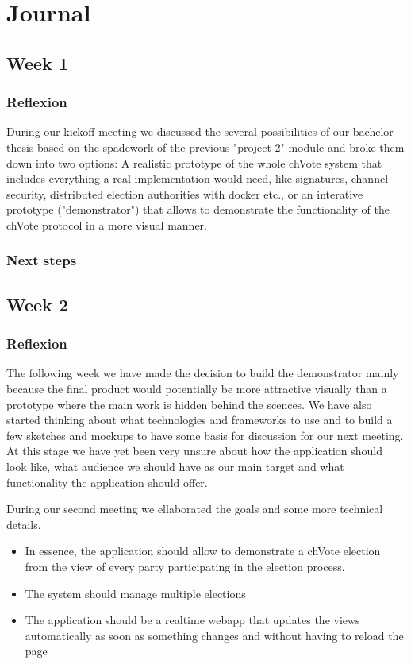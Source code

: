 \chapter{Journal}

\section{Week 1}
\subsection{Reflexion}

During our kickoff meeting we discussed the several possibilities of our
bachelor thesis based on the spadework of the previous "project 2" module and
broke them down into two options: A realistic prototype of the whole chVote
system that includes everything a real implementation would need, like
signatures, channel security, distributed election authorities with docker
etc., or an interative prototype ("demonstrator") that allows to demonstrate
the functionality of the chVote protocol in a more visual manner.

\subsection{Next steps}

\section{Week 2}
\subsection{Reflexion}

The following week we have made the decision to build the demonstrator mainly
because the final product would potentially be more attractive visually than a
prototype where the main work is hidden behind the scences. We have also
started thinking about what technologies and frameworks to use and to build a
few sketches and mockups to have some basis for discussion for our next
meeting. At this stage we have yet been very unsure about how the application
should look like, what audience we should have as our main target and what
functionality the application should offer.

During our second meeting we ellaborated the goals and some more technical details.
\begin{itemize}
\item In essence, the application should allow to demonstrate a chVote election from the view of every party participating in the election process.
\item The system should manage multiple elections
\item The application should be a realtime webapp that updates the views automatically as soon as something changes and without having to reload the page
\end{itemize}

